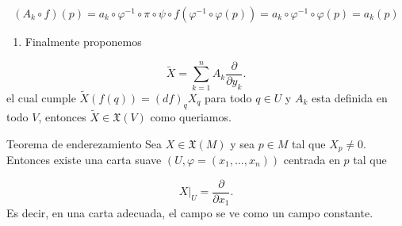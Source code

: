 \begin{bookproof}{}
\[
(A_{k}\circ f)(p)=a_{k}\circ\varphi ^{-1}\circ\pi\circ\psi\circ f(\varphi ^{-1} \circ\varphi(p))=a_{k}\circ\varphi ^{-1}\circ\varphi(p)=a_{k}(p)
\]
\begin{enumerate}[start=7]
\item Finalmente proponemos
\end{enumerate}
\[
\widetilde X=\sum_{k=1}^n A_k\frac{\partial}{\partial y_k}.
\]
el cual cumple $\widetilde{X}(f(q))=(df)_{q}X_{q}$ para todo $q\in U$ y $A_k$ esta definida en todo $V$, entonces $\widetilde X\in\mathfrak X(V)$ como queriamos.

\bookqed
\end{bookproof}
\begin{booktheorem}{Teorema de enderezamiento}
Sea $X\in\mathfrak X(M)$ y sea $p\in M$ tal que $X_p\neq0$. Entonces existe una carta suave $(U,\varphi=(x_1,\ldots,x_n))$ centrada en $p$ tal que

\[
X|_U=\frac{\partial}{\partial x_1}.
\]
Es decir, en una carta adecuada, el campo se ve como un campo constante.

\end{booktheorem}
